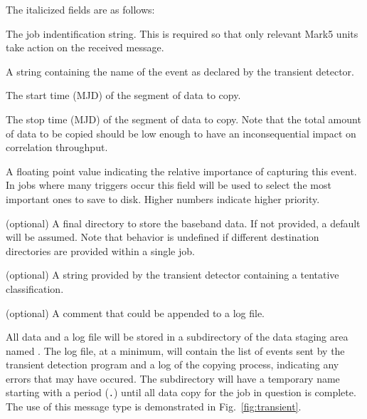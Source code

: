 \begin{description}
\noindent The italicized fields are as follows:

\begin{description}
\item{} The job indentification string.
This is required so that only relevant Mark5 units take action on the received message.
\item{} A string containing the name of the event as declared by the transient detector.
\item{} The start time (MJD) of the segment of data to copy.
\item{} The stop time (MJD) of the segment of data to copy.
Note that the total amount of data to be copied should be low enough to have an inconsequential impact on correlation throughput.
\item{} A floating point value indicating the relative importance of capturing this event.
In jobs where many triggers occur this field will be used to select the most important ones to save to disk.
Higher numbers indicate higher priority.
\item{} (optional) A final directory to store the baseband data.
If not provided, a default will be assumed.
Note that behavior is undefined if different destination directories are provided within a single job.
\item{} (optional) A string provided by the transient detector containing a tentative classification.
\item{} (optional) A comment that could be appended to a log file.
\end{description}

All data and a log file will be stored in a subdirectory of the data staging area named .
The log file, at a minimum, will contain the list of events sent by the transient detection program and a log of the copying process, indicating any errors that may have occured.
The subdirectory will have a temporary name starting with a period ({\tt .}) until all data copy for the job in question is complete.
The use of this message type is demonstrated in Fig.~\ref{fig:transient}.


\end{description}
